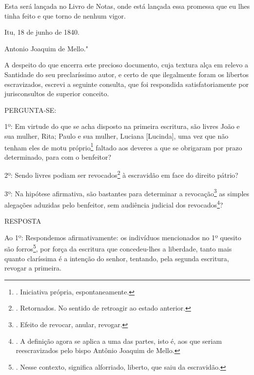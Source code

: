 Esta será lançada no Livro de Notas, onde está lançada essa promessa que
eu lhes tinha feito e que torno de nenhum vigor.

Itu, 18 de junho de 1840.

Antonio Joaquim de Mello."

A despeito do que encerra este precioso documento, cuja textura alça em
relevo a Santidade do seu preclaríssimo autor, e certo de que
ilegalmente foram os libertos escravizados, escrevi a seguinte consulta,
que foi respondida satisfatoriamente por jurisconsultos de superior
conceito.

PERGUNTA-SE:

1º: Em virtude do que se acha disposto na primeira escritura, são livres
João e sua mulher, Rita; Paulo e sua mulher, Luciana {[}Lucinda{]}, uma
vez que não tenham eles de motu próprio\footnote{. Iniciativa própria,
  espontaneamente.} faltado aos deveres a que se obrigaram por prazo
determinado, para com o benfeitor?

2º: Sendo livres podiam ser revocados\footnote{. Retornados. No sentido
  de retroagir ao estado anterior.} à escravidão em face do direito
pátrio?

3º: Na hipótese afirmativa, são bastantes para determinar a
revocação\footnote{. Efeito de revocar, anular, revogar.} as simples
alegações aduzidas pelo benfeitor, sem audiência judicial dos
revocados\footnote{. A definição agora se aplica a uma das partes, isto
  é, aos que seriam reescravizados pelo bispo Antônio Joaquim de Mello.}?

RESPOSTA

Ao 1º: Respondemos afirmativamente: os indivíduos mencionados no 1º
quesito são forros\footnote{. Nesse contexto, significa alforriado,
  liberto, que saiu da escravidão.}, por força da escritura que
concedeu-lhes a liberdade, tanto mais quanto claríssima é a intenção do
senhor, tentando, pela segunda escritura, revogar a primeira.

